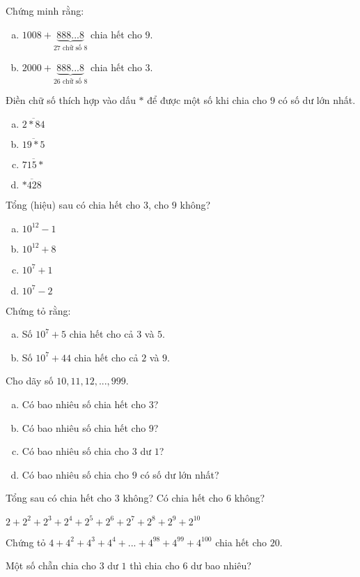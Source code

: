 \begin{bt}
\end{bt}   \begin{bt}
Chứng minh rằng:
\begin{enumerate}[a)]
\item $1008 + \underbrace {888...8}_{27 \text{ chữ số 8}}$ chia hết cho $9$.
\item $2000 + \underbrace {888...8}_{26 \text{ chữ số 8}}$ chia hết cho $3$.
\end{enumerate}  
\end{bt}   \begin{bt}
Điền chữ số thích hợp vào dấu $*$ để được một số khi chia cho $9$ có số dư lớn nhất.
\begin{enumerate}[a)]
\item $\overline {2*84}$
\item $\overline {19*5}$
\item $\overline {715*}$
\item $\overline {*428}$
\end{enumerate}  
\end{bt}   \begin{bt}
Tổng (hiệu) sau có chia hết  cho $3$, cho $9$ không?
\begin{enumerate}[a)]
\item ${10^{12}} - 1$
\item ${10^{12}} + 8$
\item ${10^{7}} + 1$
\item ${10^{7}} - 2$
\end{enumerate}  
\end{bt}   \begin{bt}
Chứng tỏ rằng:
\begin{enumerate}[a)]
\item Số ${10^{7}} + 5$ chia hết cho cả $3$ và $5$.
\item Số ${10^{7}} + 44$ chia hết cho cả $2$ và $9$.
\end{enumerate}  
\end{bt}   \begin{bt}
Cho dãy số $10, 11, 12, ... , 999$.
\begin{enumerate}[a)]
\item Có bao nhiêu số chia hết cho $3$?
\item Có bao nhiêu số chia hết cho $9$?
\item Có bao nhiêu số chia cho $3$ dư $1$?
\item Có bao nhiêu số chia cho $9$ có số dư lớn nhất?
\end{enumerate} 
\end{bt}   \begin{bt}
Tổng sau có chia hết cho $3$ không?  Có chia hết cho $6$ không?
\begin{center}
$2 + {2^2} + {2^3} + {2^4} + {2^5} + {2^6} + {2^7} + {2^8} + {2^9} + {2^{10}}$
\end{center}
\end{bt}   \begin{bt}
Chứng tỏ $4 + {4^2} + {4^3} + {4^4} + ... + {4^{98}} + {4^{99}} + {4^{100}}$ chia hết cho $20$.
\end{bt}   \begin{bt}
Một số chẵn chia cho $3$ dư $1$ thì chia cho $6$ dư bao nhiêu?
\end{bt}